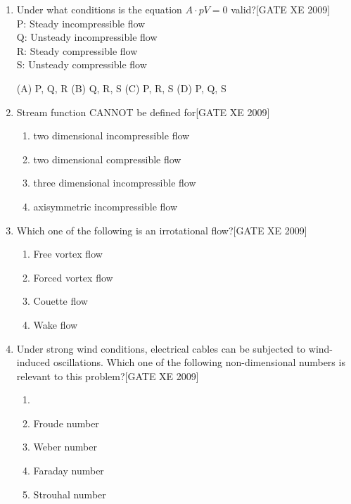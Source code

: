 \documentclass[journal,12pt,onecolumn]{IEEEtran}
\theoremstyle{remark}
\begin{document}
\begin{enumerate}


\item[Q.1] Under what conditions is the equation $A \cdot pV = 0$ valid?\hfill[GATE XE 2009] \\
P: Steady incompressible flow \\
Q: Unsteady incompressible flow \\
R: Steady compressible flow \\
S: Unsteady compressible flow

    (A) P, Q, R\hfill
    (B) Q, R, S\hfill
    (C) P, R, S\hfill
    (D) P, Q, S


\item[Q.2] Stream function CANNOT be defined for\hfill[GATE XE 2009]
\begin{multicols}{2}
\begin{enumerate}
    

   \item  two dimensional incompressible flow 
 \item  two dimensional compressible flow 
    \item  three dimensional incompressible flow 
   \item  axisymmetric incompressible flow 
\end{enumerate}
 \end{multicols}

\item[Q.3] Which one of the following is an irrotational flow?\hfill[GATE XE 2009]
\begin{enumerate}
    \item[(A)] Free vortex flow
    \item[(B)] Forced vortex flow
    \item[(C)] Couette flow
    \item[(D)] Wake flow
\end{enumerate}

\item[Q.4] Under strong wind conditions, electrical cables can be subjected to wind-induced oscillations. Which one of the following non-dimensional numbers is relevant to this problem?\hfill[GATE XE 2009]

\begin{multicols}{2}
\begin{enumerate}
       \item 


     \item  Froude number 
     \item  Weber number
     \item  Faraday number
     \item  Strouhal number
\end{enumerate} 
 \end{multicols}



\end{enumerate}
\end{document}

